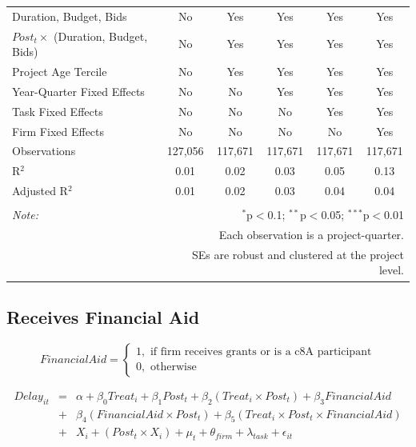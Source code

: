 \documentclass[
]{article}
\begin{document}
\begin{table}[H]
\begin{tabular}{@{\extracolsep{-2pt}}lccccc}
Duration, Budget, Bids & No & Yes & Yes & Yes & Yes \\ 
$Post_t \times $  (Duration, Budget, Bids) & No & Yes & Yes & Yes & Yes \\ 
Project Age Tercile & No & Yes & Yes & Yes & Yes \\ 
Year-Quarter Fixed Effects & No & No & Yes & Yes & Yes \\ 
Task Fixed Effects & No & No & No & Yes & Yes \\ 
Firm Fixed Effects & No & No & No & No & Yes \\ 
Observations & 127,056 & 117,671 & 117,671 & 117,671 & 117,671 \\ 
R$^{2}$ & 0.01 & 0.02 & 0.03 & 0.05 & 0.13 \\ 
Adjusted R$^{2}$ & 0.01 & 0.02 & 0.03 & 0.04 & 0.04 \\ 
\hline 
\hline \\[-1.8ex] 
\textit{Note:}  & \multicolumn{5}{r}{$^{*}$p$<$0.1; $^{**}$p$<$0.05; $^{***}$p$<$0.01} \\ 
 & \multicolumn{5}{r}{Each observation is a project-quarter.} \\ 
 & \multicolumn{5}{r}{SEs are robust and clustered at the project level.} \\ 
\end{tabular} 
\end{table}

\hypertarget{receives-financial-aid}{%
\subsection{Receives Financial Aid}\label{receives-financial-aid}}

\[ FinancialAid = \begin{cases} 1, \text{ if firm receives grants or is a c8A participant}\\
0, \text{ otherwise} \end{cases}\]

\[ \begin{aligned}
Delay_{it} &=& \alpha+\beta_0 Treat_i + \beta_1 Post_t + \beta_2 (Treat_i \times Post_t) +\beta_3 FinancialAid \\
&+& \beta_4 (FinancialAid \times Post_t) + \beta_5 (Treat_i \times Post_t \times FinancialAid) \\ 
&+&X_i + (Post_t \times X_i) + \mu_t + \theta_{firm} + \lambda_{task}+ \epsilon_{it}
\end{aligned}\]
\end{document}
